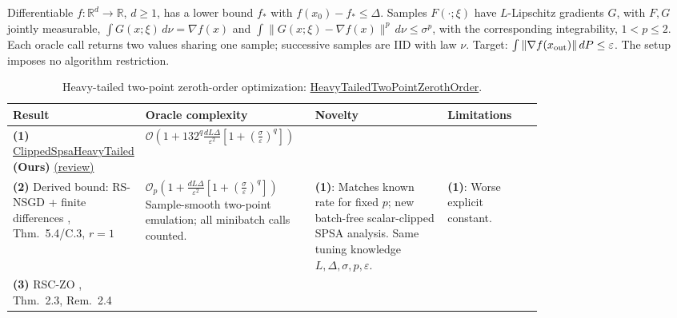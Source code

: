 \begin{table}[tp]
\centering
\caption{Heavy-tailed two-point zeroth-order optimization: \href{https://github.com/k3nfalt/longtails/blob/main/LongTails/Setups/HeavyTailedTwoPointZerothOrder.lean}{HeavyTailedTwoPointZerothOrder}.}\label{tab:HeavyTailedTwoPointZerothOrder}
\parbox{\linewidth}{\footnotesize Differentiable $f:\mathbb{R}^d\to\mathbb{R}$, $d\geq1$, has a lower bound $f_*$ with $f(x_0)-f_*\leq\Delta$. Samples $F(\cdot;\xi)$ have $L$-Lipschitz gradients $G$, with $F,G$ jointly measurable, $\int G(x;\xi)\,d\nu=\nabla f(x)$ and $\int\|G(x;\xi)-\nabla f(x)\|^p\,d\nu\leq\sigma^p$, with the corresponding integrability, $1<p\leq2$. Each oracle call returns two values sharing one sample; successive samples are IID with law $\nu$. Target: $\int\|\nabla f(x_{\rm out})\|\,dP\leq\varepsilon$. The setup imposes no algorithm restriction.}\par\smallskip
\begin{threeparttable}
\footnotesize
\setlength{\tabcolsep}{4pt}\renewcommand{\arraystretch}{1.25}
\begin{tabularx}{\linewidth}{@{}>{\raggedright\arraybackslash}p{0.20\linewidth}>{\raggedright\arraybackslash}p{0.32\linewidth}>{\raggedright\arraybackslash}p{0.25\linewidth}>{\raggedright\arraybackslash}X@{}}
\toprule
\textbf{Result} & \textbf{Oracle complexity} & \textbf{Novelty} & \textbf{Limitations} \\
\midrule
\textbf{(1)} \href{https://github.com/k3nfalt/longtails/blob/main/LongTails/Theorems/ClippedSpsaHeavyTailed.lean}{Clipped\allowbreak Spsa\allowbreak Heavy\allowbreak Tailed} \textbf{(Ours)} \href{https://github.com/k3nfalt/longtails/blob/main/scripts/reviews/ClippedSpsaHeavyTailed.md}{(review)}
& $\mathcal{O}\!\left(1+132^q\frac{dL\Delta}{\varepsilon^2}\left[1+\left(\frac{\sigma}{\varepsilon}\right)^q\right]\right)$
& & \\
\midrule[1.2pt]
\textbf{(2)} Derived bound: RS-NSGD + finite differences \citep{htzoOmiya2026v1}, Thm.~5.4/C.3, $r=1$
& $\mathcal{O}_p\!\left(1+\frac{dL\Delta}{\varepsilon^2}\left[1+\left(\frac{\sigma}{\varepsilon}\right)^q\right]\right)$
\newline Sample-smooth two-point emulation; all minibatch calls counted.
& \textbf{(1)}: Matches known rate for fixed $p$; new batch-free scalar-clipped SPSA analysis. Same tuning knowledge $L,\Delta,\sigma,p,\varepsilon$.
& \textbf{(1)}: Worse explicit constant. \\
\midrule
\textbf{(3)} RSC-ZO \citep{htzoElBakkali2026v1}, Thm.~2.3, Rem.~2.4

\end{tabularx}
\end{threeparttable}
\end{table}
